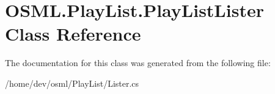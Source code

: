 \hypertarget{classOSML_1_1PlayList_1_1PlayListLister}{}\section{O\+S\+M\+L.\+Play\+List.\+Play\+List\+Lister Class Reference}
\label{classOSML_1_1PlayList_1_1PlayListLister}


The documentation for this class was generated from the following file\+:\begin{DoxyCompactItemize}
\item 
/home/dev/osml/\+Play\+List/Lister.\+cs\end{DoxyCompactItemize}
